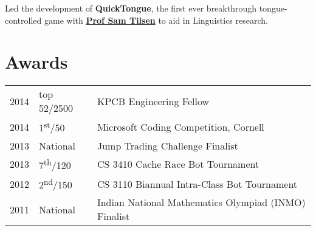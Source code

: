 \documentclass[]{deedy-resume-openfont}
\begin{document}
\begin{minipage}[t]{0.66\textwidth}
Led the development of \textbf{QuickTongue}, the first ever breakthrough tongue-controlled game with \textbf{\href{http://conf.ling.cornell.edu/~tilsen/}{Prof Sam Tilsen}} to aid in Linguistics research. 
\sectionsep


\section{Awards} 
\begin{tabular}{rll}
2014	     & top 52/2500  & KPCB Engineering Fellow\\
2014	     & 1\textsuperscript{st}/50  & Microsoft Coding Competition, Cornell\\
2013	     & National  & Jump Trading Challenge Finalist\\
2013     & 7\textsuperscript{th}/120 & CS 3410 Cache Race Bot Tournament  \\
2012     & 2\textsuperscript{nd}/150 & CS 3110 Biannual Intra-Class Bot Tournament \\
2011     & National & Indian National Mathematics Olympiad (INMO) Finalist \\
\end{tabular}
\sectionsep

\end{minipage} 
\end{document}
